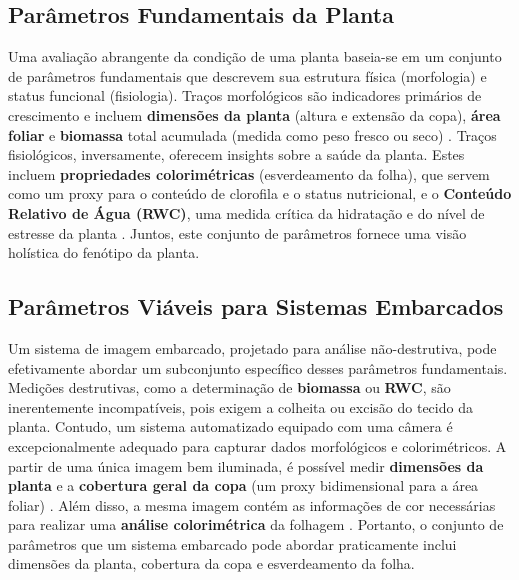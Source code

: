 \documentclass[12pt, a4paper]{article}
\begin{document}
	\subsection{Parâmetros Fundamentais da Planta}
	Uma avaliação abrangente da condição de uma planta baseia-se em um conjunto de parâmetros fundamentais que descrevem sua estrutura física (morfologia) e status funcional (fisiologia). Traços morfológicos são indicadores primários de crescimento e incluem \textbf{dimensões da planta} (altura e extensão da copa), \textbf{área foliar} e \textbf{biomassa} total acumulada (medida como peso fresco ou seco) \cite{PerezHarguindeguy2013, Sestak1971}. Traços fisiológicos, inversamente, oferecem insights sobre a saúde da planta. Estes incluem \textbf{propriedades colorimétricas} (esverdeamento da folha), que servem como um proxy para o conteúdo de clorofila e o status nutricional, e o \textbf{Conteúdo Relativo de Água (RWC)}, uma medida crítica da hidratação e do nível de estresse da planta \cite{Gitelson2003, Jones2007}. Juntos, este conjunto de parâmetros fornece uma visão holística do fenótipo da planta.
	
	\subsection{Parâmetros Viáveis para Sistemas Embarcados}
	Um sistema de imagem embarcado, projetado para análise não-destrutiva, pode efetivamente abordar um subconjunto específico desses parâmetros fundamentais. Medições destrutivas, como a determinação de \textbf{biomassa} ou \textbf{RWC}, são inerentemente incompatíveis, pois exigem a colheita ou excisão do tecido da planta. Contudo, um sistema automatizado equipado com uma câmera é excepcionalmente adequado para capturar dados morfológicos e colorimétricos. A partir de uma única imagem bem iluminada, é possível medir \textbf{dimensões da planta} e a \textbf{cobertura geral da copa} (um proxy bidimensional para a área foliar) \cite{Paulus2019}. Além disso, a mesma imagem contém as informações de cor necessárias para realizar uma \textbf{análise colorimétrica} da folhagem \cite{Karcher2003}. Portanto, o conjunto de parâmetros que um sistema embarcado pode abordar praticamente inclui dimensões da planta, cobertura da copa e esverdeamento da folha.
	
\end{document}
